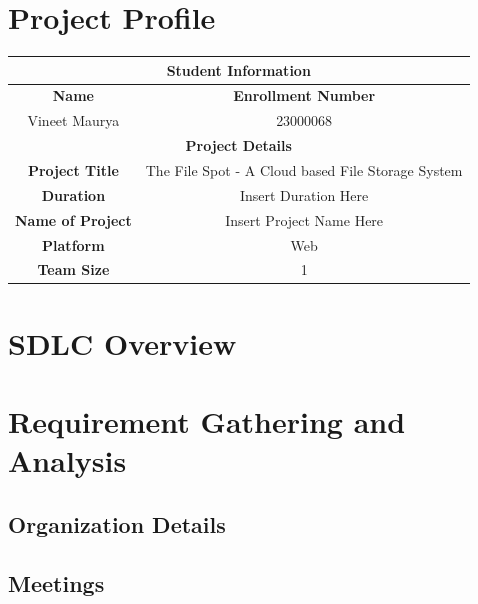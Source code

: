 \documentclass[12pt,a4paper]{report}
\begin{document}
\chapter*{Project Profile}
\begin{center}
    \begin{tabular}{|c|c|}
        \hline
        \multicolumn{2}{|c|}{\cellcolor{black} \color{white} \textbf{Student Information}} \\
        \hline
        \textbf{Name}            & \textbf{Enrollment Number}                              \\
        Vineet Maurya            & 23000068                                                \\
        \hline
        \multicolumn{2}{|c|}{\cellcolor{black} \color{white} \textbf{Project Details}}     \\
        \hline
        \textbf{Project Title}   & The File Spot - A Cloud based File Storage System       \\
        \hline
        \textbf{Duration}        & Insert Duration Here                                    \\
        \hline
        \textbf{Name of Project} & Insert Project Name Here                                \\
        \hline
        \textbf{Platform}        & Web                                                     \\
        \hline
        \textbf{Team Size}       & 1                                                       \\
        \hline
    \end{tabular}
\end{center}
\newpage
{}
\tableofcontents
\newpage
{}
\setcounter{page}{1}
\chapter{SDLC Overview}
\newpage
\chapter{Requirement Gathering and Analysis}
\section{Organization Details}
\section{Meetings}
\end{document}
